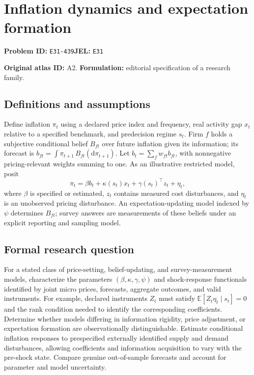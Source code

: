 \documentclass[11pt,a4paper]{article}
\begin{document}
\section*{Inflation dynamics and expectation formation}
\textbf{Problem ID:} \texttt{E31-439}\quad \textbf{JEL:} \texttt{E31}\par
\label{problem:OP-0012}
\label{atlas:prob:A2}

\noindent\textbf{Original atlas ID:} A2. \textbf{Formulation:} editorial specification of a research family.

\subsection*{Definitions and assumptions}

Define inflation $\pi_t$ using a declared price index and frequency, real activity gap $x_t$ relative to a specified benchmark, and predecision regime $s_t$. Firm $f$ holds a subjective conditional belief $B_{ft}$ over future inflation given its information; its forecast is $b_{ft}=\int\pi_{t+1}\,B_{ft}(\mathrm d\pi_{t+1})$. Let $b_t=\sum_fw_{ft}b_{ft}$, with nonnegative pricing-relevant weights summing to one. As an illustrative restricted model, posit
\[
\pi_t=\beta b_t+\kappa(s_t)x_t+\gamma(s_t)^\top z_t+\eta_t,
\]
where $\beta$ is specified or estimated, $z_t$ contains measured cost disturbances, and $\eta_t$ is an unobserved pricing disturbance. An expectation-updating model indexed by $\psi$ determines $B_{ft}$; survey answers are measurements of these beliefs under an explicit reporting and sampling model.

\subsection*{Formal research question}

For a stated class of price-setting, belief-updating, and survey-measurement models, characterize the parameters $(\beta,\kappa,\gamma,\psi)$ and shock-response functionals identified by joint micro prices, forecasts, aggregate outcomes, and valid instruments. For example, declared instruments $Z_t$ must satisfy $\mathbb E[Z_t\eta_t\mid s_t]=0$ and the rank condition needed to identify the corresponding coefficients. Determine whether models differing in information rigidity, price adjustment, or expectation formation are observationally distinguishable. Estimate conditional inflation responses to prespecified externally identified supply and demand disturbances, allowing coefficients and information acquisition to vary with the pre-shock state. Compare genuine out-of-sample forecasts and account for parameter and model uncertainty.
\end{document}
